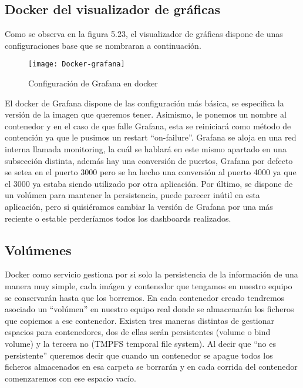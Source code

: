 \documentclass[ spanish, a4paper, 12pt, oneside]{report}
\begin{document}
\subsection{Docker del visualizador de gráficas}
Como se observa en la figura 5.23, el visualizador de gráficas dispone de unas configuraciones base que se nombraran a continuación.\\

\begin{figure}[!h]
   \centering
   \texttt{[image: Docker-grafana]}\\
      \caption{\label{fig: Configuración de Grafana en docker} Configuración de Grafana en docker}
\end{figure}

El docker de Grafana dispone de las configuración más básica, se especifica la versión de la imagen que queremos tener. Asimismo, le ponemos un nombre al contenedor y en el caso de que falle Grafana, esta se reiniciará como método de contención ya que le pusimos un restart ``on-failure''.
Grafana se aloja en una red interna llamada monitoring, la cuál se hablará en este mismo apartado en una subsección distinta, además hay una conversión de puertos, Grafana por defecto se setea en el puerto 3000 pero se ha hecho una conversión al puerto 4000 ya que el 3000 ya estaba siendo 
utilizado por otra aplicación. Por último, se dispone de un volúmen para mantener la persistencia, puede parecer inútil en esta aplicación, pero si quisiéramos cambiar la versión de Grafana por una más reciente o estable perderíamos todos los dashboards realizados. \\
\subsection{Volúmenes}

Docker como servicio gestiona por si solo la persistencia de la información de una manera muy simple, cada imágen y contenedor que tengamos en nuestro equipo se conservarán hasta que los borremos. En cada contenedor creado tendremos asociado un ``volúmen'' en nuestro equipo real donde se almacenarán 
los ficheros que copiemos a ese contenedor. Existen tres maneras distintas de gestionar espacios para contenedores, dos de ellas serán persistentes (volume o bind volume) y la tercera no (TMPFS temporal file system). Al decir que ``no es persistente'' queremos decir que cuando un contenedor se apague todos los 
ficheros almacenados en esa carpeta se borrarán y en cada corrida del contenedor comenzaremos con ese espacio vacío. \\
\end{document}
